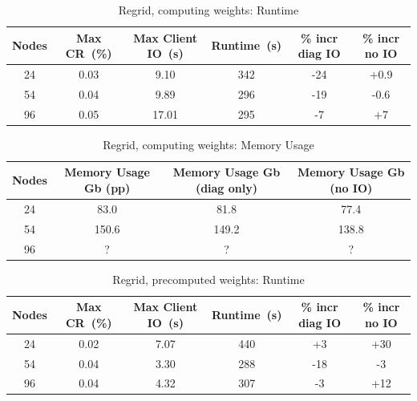 \begin{table}[ht!]
\scriptsize
  \begin{center}
    \caption{Regrid, computing weights: Runtime}
    \label{tab:table5}
     \begin{tabular}{|c|c|c|c|c|c|}
      \textbf{Nodes} & \textbf{Max CR~(\%)} & \textbf{Max Client IO~(s)} & \textbf{Runtime~(s)} & \textbf{\% incr diag IO} & \textbf{\% incr no IO}\\
      \hline
      24 & 0.03 & 9.10 & 342 & -24 & +0.9 \\ 
      54 & 0.04 & 9.89 & 296 & -19 & -0.6 \\
      96 & 0.05 & 17.01 & 295 & -7 & +7 \\
    \end{tabular}
  \end{center}
\end{table}

\begin{table}[ht!]
\scriptsize
  \begin{center}
    \caption{Regrid, computing weights: Memory Usage}
    \label{tab:table6}
     \begin{tabular}{|c|c|c|c|}
      \textbf{Nodes} & \textbf{Memory Usage Gb (pp) } & \textbf{Memory Usage Gb (diag only)} & \textbf{Memory Usage Gb (no IO)} \\
      \hline
      24 & 83.0 & 81.8 & 77.4 \\
      54 & 150.6 & 149.2 & 138.8 \\
      96 & ? & ? & ? \\
    \end{tabular}
  \end{center}
\end{table}

\begin{table}[ht!]
\scriptsize
  \begin{center}
    \caption{Regrid, precomputed weights: Runtime}
    \label{tab:table7}
     \begin{tabular}{|c|c|c|c|c|c|}
      \textbf{Nodes} & \textbf{Max CR~(\%)} & \textbf{Max Client IO~(s)} & \textbf{Runtime~(s)} & \textbf{\% incr diag IO} & \textbf{\% incr no IO}\\
      \hline
      24 & 0.02 & 7.07 & 440 & +3 & +30 \\
      54 & 0.04 & 3.30 & 288 & -18 & -3 \\
      96 & 0.04 & 4.32 & 307 & -3 & +12 \\
    \end{tabular}
  \end{center}
\end{table}

